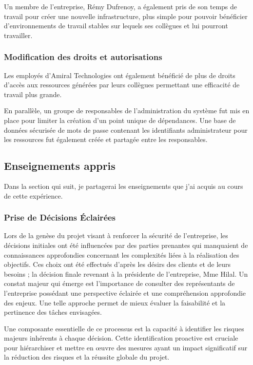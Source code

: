 Un membre de l'entreprise, Rémy Dufrenoy, a également pris de son temps de travail pour créer une nouvelle infrastructure, plus simple pour pouvoir bénéficier d'environnements de travail stables sur lequels ses collègues et lui pourront travailler.

\subsubsection{Modification des droits et autorisations}
Les employés d'Amiral Technologies ont également bénéficié de plus de droits d'accès aux ressources générées par leurs collègues permettant une efficacité de travail plus grande.

En parallèle, un groupe de responsables de l'administration du système fut mis en place pour limiter la création d'un point unique de dépendances.
Une base de données sécurisée de mots de passe contenant les identifiants administrateur pour les ressources fut également créée et partagée entre les responsables.

\subsection{Enseignements appris}
Dans la section qui suit, je partagerai les enseignements que j'ai acquis au cours de cette expérience.
\subsubsection{Prise de Décisions Éclairées}
Lors de la genèse du projet visant à renforcer la sécurité de l'entreprise, les décisions initiales ont été influencées par des parties prenantes qui manquaient de connaissances approfondies concernant les complexités liées à la réalisation des objectifs.
Ces choix ont été effectués d'après les désirs des clients et de leurs besoins ; la décision finale revenant à la présidente de l'entreprise, Mme Hilal.
Un constat majeur qui émerge est l'importance de consulter des représentants de l'entreprise possédant une perspective éclairée et une compréhension approfondie des enjeux.
Une telle approche permet de mieux évaluer la faisabilité et la pertinence des tâches envisagées.

Une composante essentielle de ce processus est la capacité à identifier les risques majeurs inhérents à chaque décision.
Cette identification proactive est cruciale pour hiérarchiser et mettre en œuvre des mesures ayant un impact significatif sur la réduction des risques et la réussite globale du projet.

